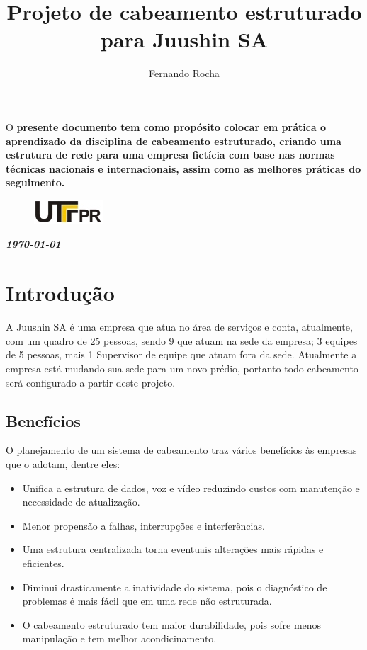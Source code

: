 \documentclass[	DIV=calc,%
paper=a4,%
fontsize=12pt,%
onecolumn]{scrartcl}	 					%
\title{Projeto de cabeamento estruturado para Juushin SA}
\author{Fernando Rocha }  	%
\date{}																				%
\newcommand{\initial}[1]{%
	\lettrine[lines=3,lhang=0.3,nindent=0em]{
		\color{DarkGoldenrod}
		{\textsf{#1}}}{}}
\begin{document}
	\maketitle
	\thispagestyle{fancy} 	
	\thispagestyle{empty}		%
	
	\initial{O}\textbf{ presente documento tem como propósito colocar em prática o aprendizado da disciplina de cabeamento estruturado, criando uma estrutura de rede para uma empresa fictícia com base nas normas técnicas nacionais e internacionais, assim como as melhores práticas do seguimento.}
	
	
	\begin{figure}
		\centering
		\includegraphics{utfpr}
	\end{figure}
	
	\vspace{2cm}
	\centerline{\textit{\textbf{\today}}}
	
	\clearpage
	\renewcommand*\listfigurename{Lista de figuras}
	\listoffigures
	
	\renewcommand*\listtablename{Lista de tabelas}
	\listoftables
	
	
	
	
	\clearpage
	\renewcommand{\contentsname}{Sumário}
	\tableofcontents
	\clearpage
	
	
	\section{Introdução}
	A Juushin SA é uma empresa que atua no área de serviços e conta, atualmente, com um quadro de 25 pessoas, sendo 9 que atuam na sede da empresa; 3 equipes de 5 pessoas, mais 1 Supervisor de equipe que atuam fora da sede. Atualmente a empresa está mudando sua sede para um novo prédio, portanto todo cabeamento será configurado a partir deste projeto.
	
	\subsection{Benefícios}
	
	O planejamento de um sistema de cabeamento traz vários benefícios às empresas que o adotam, dentre eles:
	\begin{itemize}
		\item Unifica a estrutura de dados, voz e vídeo reduzindo custos com manutenção e necessidade de atualização.
		\item Menor propensão a falhas, interrupções e interferências.
		\item Uma estrutura centralizada torna eventuais alterações  mais rápidas e eficientes.
		\item Diminui drasticamente a inatividade do sistema, pois o diagnóstico de problemas é mais fácil que em uma rede não estruturada.
		\item O cabeamento estruturado tem maior durabilidade, pois sofre menos manipulação e tem melhor acondicinamento. 
	\end{itemize}
\end{document}
